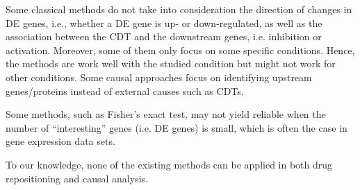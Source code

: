 Some classical methods do not take into consideration the direction of changes in DE genes, i.e., whether a DE gene is up- or down-regulated, as well as the association between the CDT and the downstream genes, i.e. inhibition or activation.  
Moreover, some of them only focus on some specific conditions. Hence, the methods are work well with the studied condition but might not work for other conditions.
Some causal approaches focus  on identifying upstream genes/proteins instead of external causes such as CDTs. 

Some methods, such as Fisher's exact test, may not yield reliable when the number of ``interesting'' genes (i.e. DE genes) is small, which is often the case in gene expression data sets. 

To our knowledge, none of the existing methods can be applied in both drug repositioning and causal analysis. 




%









